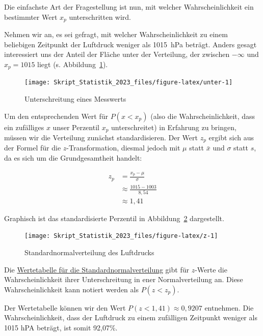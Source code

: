 \documentclass[
  11pt,
  ngerman,
  a4paper,
]{report}
\begin{document}
Die einfachste Art der Fragestellung ist nun, mit welcher Wahrscheinlichkeit ein bestimmter Wert \(x_p\) unterschritten wird.

Nehmen wir an, es sei gefragt, mit welcher Wahrscheinlichkeit zu einem beliebigen Zeitpunkt der Luftdruck weniger als 1015~hPa beträgt. Anders gesagt interessiert uns der Anteil der Fläche unter der Verteilung, der zwischen \(-\infty\) und \(x_p=1015\) liegt (s. Abbildung~\ref{fig:unter}).

\begin{figure}[H]

{\centering \texttt{[image: Skript\_Statistik\_2023\_files/figure-latex/unter-1]} 

}

\caption{Unterschreitung eines Messwerts}\label{fig:unter}
\end{figure}

Um den entsprechenden Wert für \(P(x < x_p)\) (also die Wahrscheinlichkeit, dass ein zufälliges \(x\) unser Perzentil \(x_p\) unterschreitet) in Erfahrung zu bringen, müssen wir die Verteilung zunächst standardisieren. Der Wert \(z_p\) ergibt sich aus der Formel für die \(z\)-Transformation, diesmal jedoch mit \(\mu\) statt \(\bar{x}\) und \(\sigma\) statt \(s\), da es sich um die Grundgesamtheit handelt:

\[\begin{aligned}
    z_p &= \frac{x_p-\mu}{\sigma} \\[4pt]
        &\approx \frac{1015-1003}{8{,}54}\\[4pt]
        &\approx 1{,}41
  \end{aligned}
\]

Graphisch ist das standardisierte Perzentil in Abbildung~\ref{fig:z} dargestellt.

\begin{figure}[H]

{\centering \texttt{[image: Skript\_Statistik\_2023\_files/figure-latex/z-1]} 

}

\caption{Standardnormalverteilung des Luftdrucks}\label{fig:z}
\end{figure}

Die \protect\hyperlink{tabelle-z}{Wertetabelle für die Standardnormalverteilung} gibt für \(z\)-Werte die Wahrscheinlichkeit ihrer Unterschreitung in ener Normalverteilung an. Diese Wahrscheinlichkeit kann notiert werden als \(P(z < z_p)\).

Der Wertetabelle können wir den Wert \(P(z < 1{,}41) \approx 0{,}9207\) entnehmen. Die Wahrscheinlichkeit, dass der Luftdruck zu einem zufälligen Zeitpunkt weniger als 1015 hPA beträgt, ist somit 92,07\%.
\end{document}
